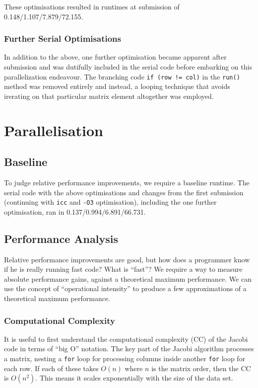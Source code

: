 \documentclass{article}
\begin{document}
These optimisations resulted in runtimes at submission of
0.148/1.107/7.879/72.155.

\subsubsection{Further Serial Optimisations}
In addition to the above, one further optimisation became apparent
after submission and was dutifully included in the serial code before
embarking on this parallelization endeavour. The branching code
\texttt{if (row != col)} in the \texttt{run()} method was removed
entirely and instead, a looping technique that avoids irerating on
that particular matrix element altogether was employed.

\section{Parallelisation}

\subsection{Baseline}
To judge relative performance improvements, we require a baseline
runtime. The serial code with the above optimisations and changes from
the first submission (continuing with \texttt{icc} and \texttt{-O3}
optimisation), including the one further optimisation, ran in
0.137/0.994/6.891/66.731.

\subsection{Performance Analysis}
Relative performance improvements are good, but how does a programmer
know if he is really running fast code? What is ``fast''? We require a
way to measure absolute performance gains, against a theoretical
maximum performance. We can use the concept of ``operational
intensity'' to produce a few approximations of a theoretical maximum
performance.

\subsubsection{Computational Complexity}
It is useful to first understand the computational complexity (CC) of
the Jacobi code in terms of ``big O'' notation. The key part of the
Jacobi algorithm processes a matrix, nesting a \texttt{for} loop for
processing columns inside another \texttt{for} loop for each row. If
each of these takes \(O(n)\) where \(n\) is the matrix order, then the
CC is \(O(n^2)\). This means it scales exponentially with the size of
the data set.
\end{document}
